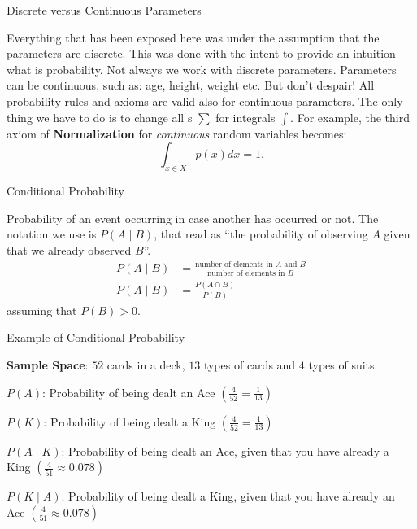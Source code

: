 \begin{frame}{Discrete versus Continuous Parameters}

	Everything that has been exposed here was under the assumption that the
	parameters are discrete.
	This was done with the intent to provide an intuition what is probability.
	Not always we work with discrete parameters.
	Parameters can be continuous, such as: age, height, weight etc.
	But don't despair!
	All probability rules and axioms are valid also for continuous parameters.
	The only thing we have to do is to change all s $\sum$ for integrals $\int$.
	For example, the third axiom of \textbf{Normalization} for \textit{continuous}
	random variables becomes:
	$$
		\int_{x \in X} p(x) dx = 1.
	$$
\end{frame}


\begin{frame}{Conditional Probability}
	\begin{defn}
		Probability of an event occurring in case another has occurred or not. \newline \newline
		The notation we use is $P( A \mid B )$, that read as ``the probability of
		observing $A$ given that we already observed $B$''. \newline \newline
		$$
			\begin{aligned}
				P(A \mid B) & = \frac{\text{number of elements in $A$ and $B$}}{\text{number of elements in $B$}} \\
				P(A \mid B) & = \frac{P(A \cap B)}{P(B)}
			\end{aligned}
		$$
		\newline \hspace{0.7\textwidth}
		{\footnotesize assuming that $P(B) > 0$}.
	\end{defn}
\end{frame}

\begin{frame}{Example of Conditional Probability}
	\begin{example}
		\begin{vfilleditems}
			\item \textbf{Sample Space}: $52$ cards in a deck, $13$ types of cards and $4$ types of suits.
			\item $P(A)$: Probability of being dealt an Ace $\left( \frac{4}{52} = \frac{1}{13}\right)$
			\item $P(K)$: Probability of being dealt a King $\left( \frac{4}{52} = \frac{1}{13} \right)$
			\item $P(A \mid K)$: Probability of being dealt an Ace, given that you have already a King $\left( \frac{4}{51} \approx 0.078 \right)$
			\item $P(K \mid A)$: Probability of being dealt a King, given that you have already an Ace $\left( \frac{4}{51} \approx 0.078 \right)$
		\end{vfilleditems}
	\end{example}
\end{frame}


